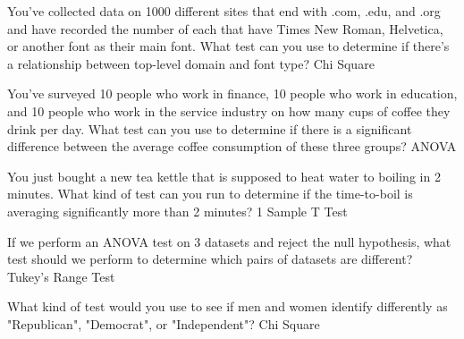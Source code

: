 \documentclass{journal}
\begin{document}
You've collected data on 1000 different sites that end with .com, .edu, and .org and have recorded the number of each that have Times New Roman, Helvetica, or another font as their main font. What test can you use to determine if there's a relationship between top-level domain and font type?
Chi Square


You've surveyed 10 people who work in finance, 10 people who work in education, and 10 people who work in the service industry on how many cups of coffee they drink per day. What test can you use to determine if there is a significant difference between the average coffee consumption of these three groups?
ANOVA

You just bought a new tea kettle that is supposed to heat water to boiling in 2 minutes. What kind of test can you run to determine if the time-to-boil is averaging significantly more than 2 minutes?
1 Sample T Test

If we perform an ANOVA test on 3 datasets and reject the null hypothesis, what test should we perform to determine which pairs of datasets are different?
Tukey's Range Test

What kind of test would you use to see if men and women identify differently as "Republican", "Democrat", or "Independent"?
Chi Square
\end{document}
